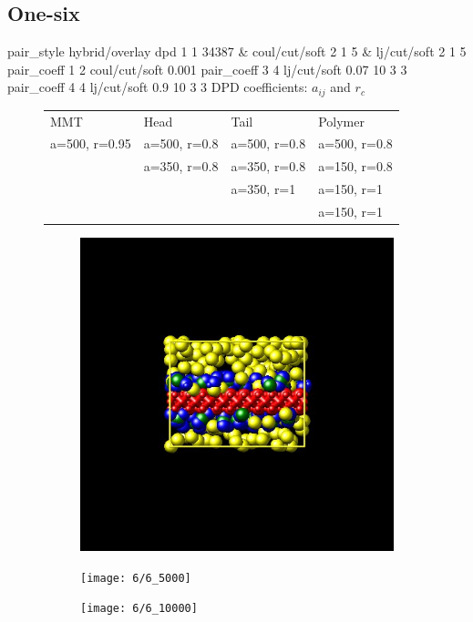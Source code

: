 \documentclass[a4paper]{article}
\begin{document}
\subsection*{One-six}
pair\_style hybrid/overlay dpd 1 1 34387 \& coul/cut/soft 2 1 5 \& 
lj/cut/soft 2 1 5\newline
pair\_coeff 1 2 coul/cut/soft 0.001\newline
pair\_coeff 3 4 lj/cut/soft 0.07    10 3 3\newline
pair\_coeff 4 4 lj/cut/soft 0.9     10 3 3\newline
DPD coefficients: $a_{ij}$ and $r_c$
\begin{figure}[H]\begin{tabular}{llll}
MMT           & Head         & Tail         & Polymer      \\
a=500, r=0.95 & a=500, r=0.8 & a=500, r=0.8 & a=500, r=0.8 \\
              & a=350, r=0.8 & a=350, r=0.8 & a=150, r=0.8 \\
              &              & a=350, r=1   & a=150, r=1   \\
              &              &              & a=150, r=1   \\
\end{tabular}\end{figure}

\begin{figure}[H]
\begin{subfigure}{0.3\textwidth}
  \centering
  \includegraphics[width=\linewidth,keepaspectratio]{start}
  \caption{}
\end{subfigure}
\begin{subfigure}{0.3\textwidth}
  \centering
  \texttt{[image: 6/6\_5000]}
  \caption{}
\end{subfigure}
\begin{subfigure}{0.3\textwidth}
  \centering
  \texttt{[image: 6/6\_10000]}
  \caption{}
\end{subfigure}
\caption{}
\label{fig_1}
\end{figure}
\end{document}
